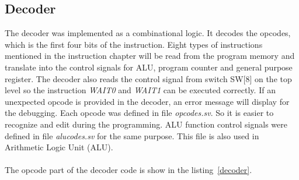 \subsection{Decoder} \label{Decoder}
The decoder was implemented as a combinational logic. It decodes the opcodes, which is the first four bits of the instruction. Eight types of instructions mentioned in the instruction chapter will be read from the program memory and translate into the control signals for ALU, program counter and general purpose register. The decoder also reads the control signal from switch SW[8] on the top level so the instruction \textit{WAIT0} and \textit{WAIT1} can be executed correctly. If an unexpected opcode is provided in the decoder, an error message will display for the debugging. Each opcode was defined in file \textit{opcodes.sv}. So it is easier to recognize and edit during the programming. ALU function control signals were defined in file \textit{alucodes.sv} for the same purpose. This file is also used in Arithmetic Logic Unit (ALU).\\\\ 
The opcode part of the decoder code is show in the listing~\ref{decoder}. 
